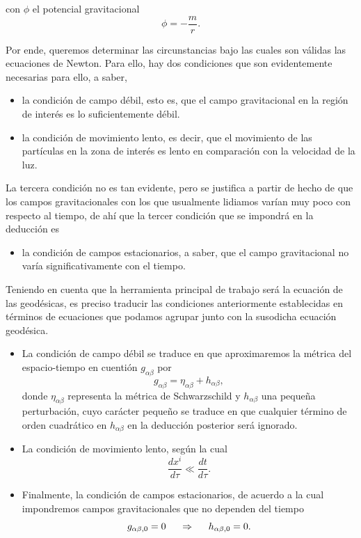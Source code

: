 \documentclass[16pt,a4paper]{article}
\numberwithin{equation}{section}
\theoremstyle{definition}
\begin{document}
con $\phi$ el potencial gravitacional
\begin{equation*}
\phi = - \frac{m}{r}.
\end{equation*}

Por ende, queremos determinar las circunstancias bajo las cuales son válidas las ecuaciones de Newton. Para ello, hay dos condiciones que son evidentemente necesarias para ello, a saber,
\begin{itemize}
\item la condición de campo débil, esto es, que el campo gravitacional en la región de interés es lo suficientemente débil.
\item la condición de movimiento lento, es decir, que el movimiento de las partículas en la zona de interés es lento en comparación con la velocidad de la luz.
\end{itemize}

La tercera condición no es tan evidente, pero se justifica a partir de hecho de que los campos gravitacionales con los que usualmente lidiamos varían muy poco con respecto al tiempo, de ahí que la tercer condición que se impondrá en la deducción es
\begin{itemize}
\item la condición de campos estacionarios, a saber, que el campo gravitacional no varía significativamente con el tiempo.
\end{itemize}

Teniendo en cuenta que la herramienta principal de trabajo será la ecuación de las geodésicas, es preciso traducir las condiciones anteriormente establecidas en términos de ecuaciones que podamos agrupar junto con la susodicha ecuación geodésica.\\
\begin{itemize}
\item La condición de campo débil se traduce en que aproximaremos la métrica del espacio-tiempo en cuentión $g_{\alpha \beta}$ por 
\begin{equation}
\label{weak field}
g_{\alpha \beta} = \eta_{\alpha \beta} + h_{\alpha \beta},
\end{equation}
donde $\eta_{\alpha \beta}$ representa la métrica de Schwarzschild y $h_{\alpha \beta}$ una pequeña perturbación, cuyo carácter pequeño se traduce en que cualquier término de orden cuadrático en $h_{\alpha \beta}$ en la deducción posterior será ignorado.
\item La condición de movimiento lento, según la cual
\begin{equation*}
\frac{dx^i}{d\tau} \ll \frac{dt}{d\tau}.
\end{equation*}
\item Finalmente, la condición de campos estacionarios, de acuerdo a la cual impondremos campos gravitacionales que no dependen del tiempo
\begin{equation*}
g_{\alpha \beta,0} =0 \hspace{.5cm}\Rightarrow\hspace{.5cm} h_{\alpha \beta,0} =0.
\end{equation*}
\end{itemize}
\end{document}
